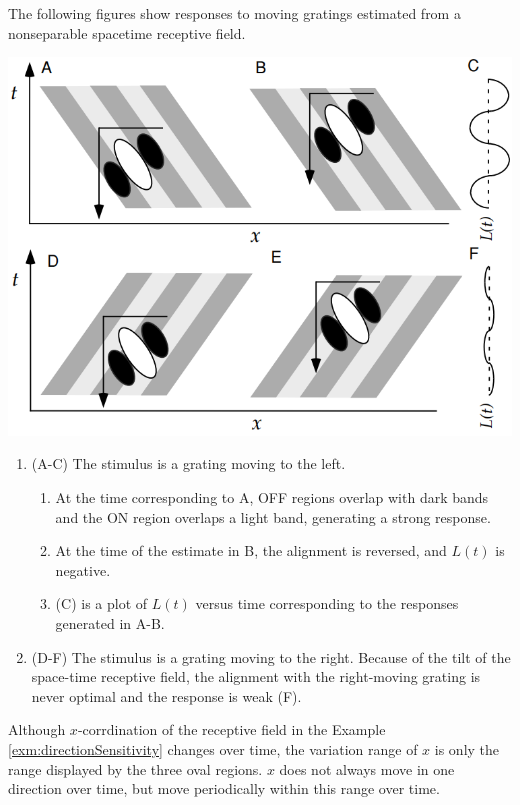 \begin{exm}
  \label{exm:directionSensitivity}
  The following figures show responses to moving gratings estimated from a nonseparable spacetime receptive field.
  \begin{center}
    \includegraphics[scale=0.3]{./png/directionSensitivity}
  \end{center}
  \begin{enumerate}[]
  \item (A-C) The stimulus is a grating moving to the left.
    \begin{enumerate}[-]
    \item At the time corresponding to A, OFF regions overlap with dark bands and the ON region overlaps a light band, generating a strong response.
    \item At the time of the estimate in B, the alignment is reversed, and $L(t)$ is negative.
    \item (C) is a plot of $L(t)$ versus time corresponding to the responses generated in A-B.
    \end{enumerate}
  \item (D-F) The stimulus is a grating moving to the right. Because of the tilt of the space-time receptive field, the alignment with the right-moving grating is never optimal and the response is weak (F).
  \end{enumerate}
\end{exm}

\begin{rem}
  Although $x$-corrdination of the receptive field in the Example \ref{exm:directionSensitivity} changes over time, the variation range of $x$ is only the range displayed by the three oval regions. $x$ does not always move in one direction over time, but move periodically within this range over time.
\end{rem}

